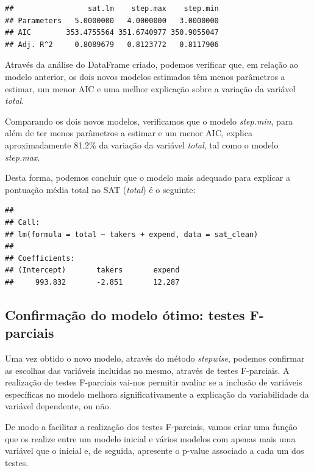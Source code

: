 \documentclass[]{article}
\begin{document}
\begin{verbatim}
##                 sat.lm    step.max    step.min
## Parameters   5.0000000   4.0000000   3.0000000
## AIC        353.4755564 351.6740977 350.9055047
## Adj. R^2     0.8089679   0.8123772   0.8117906
\end{verbatim}

Através da análise do DataFrame criado, podemos verificar que, em
relação ao modelo anterior, os dois novos modelos estimados têm menos
parâmetros a estimar, um menor AIC e uma melhor explicação sobre a
variação da variável \emph{total}.

Comparando os dois novos modelos, verificamos que o modelo
\emph{step.min}, para além de ter menos parâmetros a estimar e um menor
AIC, explica aproximadamente 81.2\% da variação da variável
\emph{total}, tal como o modelo \emph{step.max}.

Desta forma, podemos concluir que o modelo mais adequado para explicar a
pontuação média total no SAT (\emph{total}) é o seguinte:

\begin{Shaded}
\begin{Highlighting}[]
\OtherTok{\textless{}{-}}
\end{Highlighting}
\end{Shaded}

\begin{verbatim}
## 
## Call:
## lm(formula = total ~ takers + expend, data = sat_clean)
## 
## Coefficients:
## (Intercept)       takers       expend  
##     993.832       -2.851       12.287
\end{verbatim}

\subsection{Confirmação do modelo ótimo: testes F-parciais}

Uma vez obtido o novo modelo, através do método \emph{stepwise}, podemos
confirmar as escolhas das variáveis incluídas no mesmo, através de
testes F-parciais. A realização de testes F-parciais vai-nos permitir
avaliar se a inclusão de variáveis específicas no modelo melhora
significativamente a explicação da variabilidade da variável dependente,
ou não.

De modo a facilitar a realização dos testes F-parciais, vamos criar uma
função que os realize entre um modelo inicial e vários modelos com
apenas mais uma variável que o inicial e, de seguida, apresente o
p-value associado a cada um dos testes.
\end{document}
